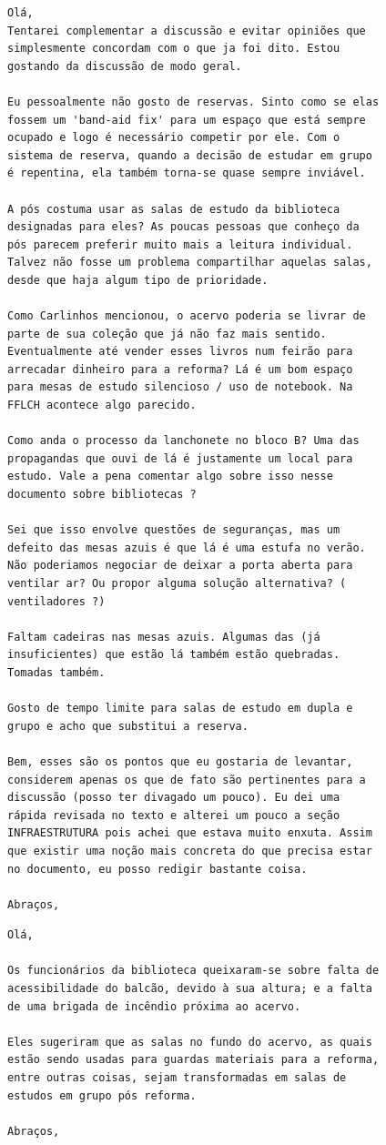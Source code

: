 \documentclass[titlepage]{article}
\begin{document}
\begin{lstlisting}[caption=Enviado por Victor Sprengel]
Olá,
Tentarei complementar a discussão e evitar opiniões que 
simplesmente concordam com o que ja foi dito. Estou 
gostando da discussão de modo geral.

Eu pessoalmente não gosto de reservas. Sinto como se elas 
fossem um 'band-aid fix' para um espaço que está sempre 
ocupado e logo é necessário competir por ele. Com o 
sistema de reserva, quando a decisão de estudar em grupo 
é repentina, ela também torna-se quase sempre inviável. 

A pós costuma usar as salas de estudo da biblioteca 
designadas para eles? As poucas pessoas que conheço da 
pós parecem preferir muito mais a leitura individual. 
Talvez não fosse um problema compartilhar aquelas salas, 
desde que haja algum tipo de prioridade.

Como Carlinhos mencionou, o acervo poderia se livrar de 
parte de sua coleção que já não faz mais sentido. 
Eventualmente até vender esses livros num feirão para 
arrecadar dinheiro para a reforma? Lá é um bom espaço 
para mesas de estudo silencioso / uso de notebook. Na 
FFLCH acontece algo parecido.

Como anda o processo da lanchonete no bloco B? Uma das 
propagandas que ouvi de lá é justamente um local para 
estudo. Vale a pena comentar algo sobre isso nesse 
documento sobre bibliotecas ?

Sei que isso envolve questões de seguranças, mas um 
defeito das mesas azuis é que lá é uma estufa no verão. 
Não poderiamos negociar de deixar a porta aberta para 
ventilar ar? Ou propor alguma solução alternativa? (
ventiladores ?)

Faltam cadeiras nas mesas azuis. Algumas das (já 
insuficientes) que estão lá também estão quebradas. 
Tomadas também.

Gosto de tempo limite para salas de estudo em dupla e 
grupo e acho que substitui a reserva.

Bem, esses são os pontos que eu gostaria de levantar, 
considerem apenas os que de fato são pertinentes para a 
discussão (posso ter divagado um pouco). Eu dei uma 
rápida revisada no texto e alterei um pouco a seção 
INFRAESTRUTURA pois achei que estava muito enxuta. Assim 
que existir uma noção mais concreta do que precisa estar 
no documento, eu posso redigir bastante coisa.

Abraços,
\end{lstlisting}


\begin{lstlisting}[caption=Enviado por Leonardo Lana]
Olá,

Os funcionários da biblioteca queixaram-se sobre falta de 
acessibilidade do balcão, devido à sua altura; e a falta 
de uma brigada de incêndio próxima ao acervo.

Eles sugeriram que as salas no fundo do acervo, as quais 
estão sendo usadas para guardas materiais para a reforma, 
entre outras coisas, sejam transformadas em salas de 
estudos em grupo pós reforma.

Abraços,
\end{lstlisting}
\end{document}
